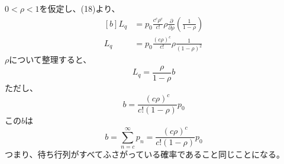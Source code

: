 \documentclass{report}
\begin{document}
\begin{CJK}{UTF8}{min}
\begin{equation}
    \end{equation}
    $0<\rho<1$を仮定し、(18)より、
    \begin{equation}
        \begin{aligned}[b]
            L_q & =p_0\frac{c^c\rho^c}{c!}\rho\frac{\partial}{\partial\rho}\left(\frac{1}{1-\rho}\right) \\
            L_q & =p_0\frac{(c\rho)^c}{c!}\rho\frac{1}{(1-\rho)^2}
        \end{aligned}
    \end{equation}
    $\rho$について整理すると、
    \begin{equation}
        L_q=\frac{\rho}{1-\rho}b
    \end{equation}
    ただし、
    \begin{equation}
        b=\frac{(c\rho)^c}{c!(1-\rho)}p_0
    \end{equation}
    この$b$は
    \begin{equation}
        b=\sum_{n=c}^\infty p_n=\frac{(c\rho)^c}{c!(1-\rho)}p_0
    \end{equation}
    つまり、待ち行列がすべてふさがっている確率であること同じことになる。

    \newpage

\end{CJK}
\end{document}
